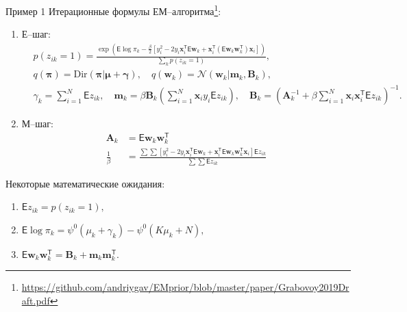 \documentclass[9pt,pdf,hyperref={unicode}]{beamer}
\begin{document}
\begin{frame}{Пример 1}
\justifying
Итерационные формулы ЕМ--алгоритма\footnote[1]{\url{https://github.com/andriygav/EMprior/blob/master/paper/Grabovoy2019Draft.pdf}}:
	\begin{enumerate}
		\item Е--шаг: 
			\begin{equation}
			\label{sl:4:eq:1}
				\begin{aligned}
					&p(z_{ik} = 1) = \frac{\exp\left(\mathsf{E}\log\pi_k - \frac{\beta}{2}\left[y_i^2 -2y_i\textbf{x}_i^{\mathsf{T}}\mathsf{E}\textbf{w}_k +\textbf{x}_i^{\mathsf{T}}\left(\mathsf{E}\textbf{w}_k\textbf{w}_k^{\mathsf{T}}\right)\textbf{x}_i\right] \right)}{\sum_k p(z_{ik}=1)},\\
					&q(\bm{\pi}) = \text{Dir}(\bm{\pi}|\bm{\mu}+ \bm{\gamma}), \quad
					q(\textbf{w}_k) = \mathcal{N}(\textbf{w}_k|\textbf{m}_k, \textbf{B}_k),\\
					&\gamma_k=\sum_{i=1}^{N}\mathsf{E}z_{ik}, \quad 
					\textbf{m}_k = \beta\textbf{B}_k\left(\sum_{i=1}^{N}\textbf{x}_iy_i\mathsf{E}z_{ik} \right), \quad
					\textbf{B}_k = \left(\textbf{A}_k^{-1} + \beta\sum_{i=1}^{N}\textbf{x}_i\textbf{x}_i^{\mathsf{T}}\mathsf{E}z_{ik}\right)^{-1}.
				\end{aligned}
			\end{equation}
		\item М--шаг: 
			\begin{equation}
			\label{sl:4:eq:2}
				\begin{aligned}
					\textbf{A}_k &= \mathsf{E}\textbf{w}_k\textbf{w}_k^{\mathsf{T}}\\
					 \frac{1}{\beta} &= \frac{\sum\sum\left[y_i^2 -2y_i\textbf{x}_i^{\mathsf{T}}\mathsf{E}\textbf{w}_k+\textbf{x}_i^{\mathsf{T}}\mathsf{E}\textbf{w}_k\textbf{w}_k^{\mathsf{T}}\textbf{x}_i\right]\mathsf{E}z_{ik}}{\sum\sum \mathsf{E}z_{ik}}
				\end{aligned}
			\end{equation}
	\end{enumerate}
Некоторые математические ожидания:
	\begin{enumerate}
		\item $\mathsf{E}z_{ik} = p(z_{ik} = 1),$
		\item $\mathsf{E}\log\pi_{k} = \psi^{0}(\mu_k + \gamma_k) - \psi^{0}(K\mu_k + N),$
		\item $\mathsf{E}\textbf{w}_k\textbf{w}_k^{\mathsf{T}} = \textbf{B}_k + \textbf{m}_k\textbf{m}_k^{\mathsf{T}}.$
	\end{enumerate}
\end{frame}
\end{document}
